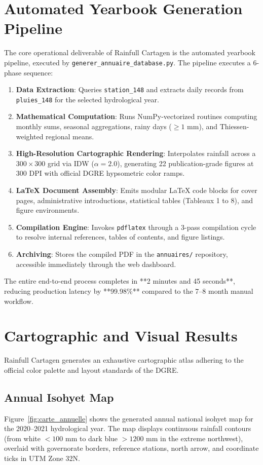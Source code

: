 \documentclass[12pt,a4paper]{report}
\begin{document}
\section{Automated Yearbook Generation Pipeline}

The core operational deliverable of Rainfull Cartagen is the automated yearbook pipeline, executed by \texttt{generer\_annuaire\_database.py}. The pipeline executes a 6-phase sequence:
\begin{enumerate}
  \item \textbf{Data Extraction}: Queries \texttt{station\_148} and extracts daily records from \texttt{pluies\_148} for the selected hydrological year.
  \item \textbf{Mathematical Computation}: Runs NumPy-vectorized routines computing monthly sums, seasonal aggregations, rainy days ($\geq 1\text{ mm}$), and Thiessen-weighted regional means.
  \item \textbf{High-Resolution Cartographic Rendering}: Interpolates rainfall across a $300 \times 300$ grid via IDW ($\alpha = 2.0$), generating 22 publication-grade figures at 300 DPI with official DGRE hypsometric color ramps.
  \item \textbf{LaTeX Document Assembly}: Emits modular LaTeX code blocks for cover pages, administrative introductions, statistical tables (Tableaux 1 to 8), and figure environments.
  \item \textbf{Compilation Engine}: Invokes \texttt{pdflatex} through a 3-pass compilation cycle to resolve internal references, tables of contents, and figure listings.
  \item \textbf{Archiving}: Stores the compiled PDF in the \texttt{annuaires/} repository, accessible immediately through the web dashboard.
\end{enumerate}

The entire end-to-end process completes in **2 minutes and 45 seconds**, reducing production latency by **99.98\%** compared to the 7--8 month manual workflow.

\section{Cartographic and Visual Results}

Rainfull Cartagen generates an exhaustive cartographic atlas adhering to the official color palette and layout standards of the DGRE.

\subsection{Annual Isohyet Map}
Figure~\ref{fig:carte_annuelle} shows the generated annual national isohyet map for the 2020--2021 hydrological year. The map displays continuous rainfall contours (from white $<100\text{ mm}$ to dark blue $>1200\text{ mm}$ in the extreme northwest), overlaid with governorate borders, reference stations, north arrow, and coordinate ticks in UTM Zone 32N.
\end{document}
